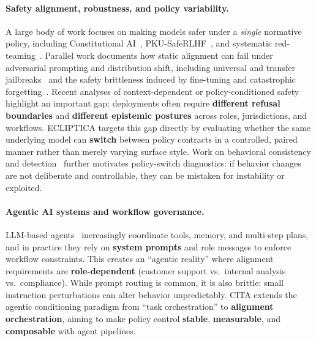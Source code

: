 \paragraph{Safety alignment, robustness, and policy variability.}
A large body of work focuses on making models safer under a \emph{single} normative policy, including Constitutional AI~\cite{bai2022constitutional}, PKU-SafeRLHF~\cite{ji2024pku}, and systematic red-teaming~\cite{perez2022red,ganguli2022red}. Parallel work documents how static alignment can fail under adversarial prompting and distribution shift, including universal and transfer jailbreaks~\cite{zou2023universal,wei2023jailbroken,liu2023jailbreaking} and the safety brittleness induced by fine-tuning and catastrophic forgetting~\cite{qi2023fine,huang2023catastrophic}. Recent analyses of context-dependent or policy-conditioned safety~\cite{bianchi2024safetytuned} highlight an important gap: deployments often require \textbf{different refusal boundaries} and \textbf{different epistemic postures} across roles, jurisdictions, and workflows. ECLIPTICA targets this gap directly by evaluating whether the same underlying model can \textbf{switch} between policy contracts in a controlled, paired manner rather than merely varying surface style. Work on behavioral consistency and detection~\cite{roy2025comprehensive} further motivates policy-switch diagnostics: if behavior changes are not deliberate and controllable, they can be mistaken for instability or exploited.

\paragraph{Agentic AI systems and workflow governance.}
LLM-based agents~\cite{wang2024survey,xi2023rise} increasingly coordinate tools, memory, and multi-step plans, and in practice they rely on \textbf{system prompts} and role messages to enforce workflow constraints. This creates an ``agentic reality'' where alignment requirements are \textbf{role-dependent} (customer support vs.\ internal analysis vs.\ compliance). While prompt routing is common, it is also brittle: small instruction perturbations can alter behavior unpredictably. CITA extends the agentic conditioning paradigm from ``task orchestration'' to \textbf{alignment orchestration}, aiming to make policy control \textbf{stable}, \textbf{measurable}, and \textbf{composable} with agent pipelines.

